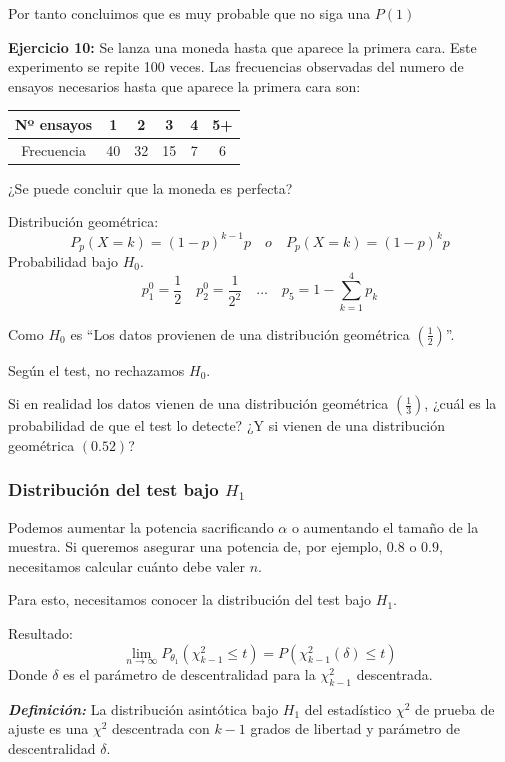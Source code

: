 Por tanto concluimos que es muy probable que no siga una $P(1)$

\textbf{Ejercicio 10:} Se lanza una moneda hasta que aparece la primera cara. Este experimento se repite 100 veces. Las frecuencias observadas del numero de ensayos necesarios hasta que aparece la primera cara son:

\begin{table}[!h]
    \centering
    \begin{tabular}{|c|c|c|c|c|c|}
        \hline
        {Nº ensayos} & 1 & 2 & 3 & 4 & 5+ \\ \hline
        {Frecuencia} & 40 & 32 & 15 & 7 & 6 \\ \hline
    \end{tabular}
\end{table}

¿Se puede concluir que la moneda es perfecta?

Distribución geométrica:
\[
    P_p(X=k)=(1-p)^{k-1}p \quad o \quad P_p(X=k)=(1-p)^{k}p
\]
Probabilidad bajo $H_0$.
\[
    p_1^0=\frac{1}{2} \quad p_2^0=\frac{1}{2^2} \quad \dots \quad p_5=1-\sum_{k=1}^{4} p_k
\]

Como $H_0$ es ``Los datos provienen de una distribución geométrica $\left(\frac{1}{2}\right)$''.

Según el test, no rechazamos $H_0$.

Si en realidad los datos vienen de una distribución geométrica $\left(\frac{1}{3}\right)$,  
¿cuál es la probabilidad de que el test lo detecte?  
¿Y si vienen de una distribución geométrica $(0.52)$?

\subsubsection{Distribución del test bajo $H_1$}

Podemos aumentar la potencia sacrificando $\alpha$ o aumentando el tamaño de la muestra.  
Si queremos asegurar una potencia de, por ejemplo, $0.8$ o $0.9$, necesitamos calcular cuánto debe valer $n$.

Para esto, necesitamos conocer la distribución del test bajo $H_1$.

Resultado:
\[
\lim_{n \to \infty} P_{\theta_1} (\chi^2_{k-1} \leq t) = P(\chi^2_{k-1}(\delta) \leq t)
\]
Donde $\delta$ es el parámetro de descentralidad para la $\chi^2_{k-1}$ descentrada.

\noindent \textit{\textbf{Definición:}} La distribución asintótica bajo $H_1$ del estadístico $\chi^2$ de prueba de ajuste es una $\chi^2$ descentrada con $k-1$ grados de libertad y parámetro de descentralidad $\delta$.

